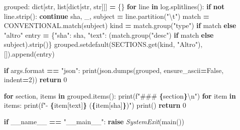 \documentclass[
  italian,
  10pt,
]{book}
\newenvironment{Shaded}{\begin{snugshade}}{\end{snugshade}}
\newcommand{\BuiltInTok}[1]{#1}
\newcommand{\CharTok}[1]{\textcolor[rgb]{0.31,0.60,0.02}{#1}}
\newcommand{\ControlFlowTok}[1]{\textcolor[rgb]{0.13,0.29,0.53}{\textbf{#1}}}
\newcommand{\DecValTok}[1]{\textcolor[rgb]{0.00,0.00,0.81}{#1}}
\newcommand{\KeywordTok}[1]{\textcolor[rgb]{0.13,0.29,0.53}{\textbf{#1}}}
\newcommand{\NormalTok}[1]{#1}
\newcommand{\OperatorTok}[1]{\textcolor[rgb]{0.81,0.36,0.00}{\textbf{#1}}}
\newcommand{\PreprocessorTok}[1]{\textcolor[rgb]{0.56,0.35,0.01}{\textit{#1}}}
\newcommand{\SpecialCharTok}[1]{\textcolor[rgb]{0.81,0.36,0.00}{\textbf{#1}}}
\newcommand{\SpecialStringTok}[1]{\textcolor[rgb]{0.31,0.60,0.02}{#1}}
\newcommand{\StringTok}[1]{\textcolor[rgb]{0.31,0.60,0.02}{#1}}
\newcommand{\VariableTok}[1]{\textcolor[rgb]{0.00,0.00,0.00}{#1}}
\begin{document}
\begin{Shaded}
\begin{Highlighting}[]
\NormalTok{    grouped: }\BuiltInTok{dict}\NormalTok{[}\BuiltInTok{str}\NormalTok{, }\BuiltInTok{list}\NormalTok{[}\BuiltInTok{dict}\NormalTok{[}\BuiltInTok{str}\NormalTok{, }\BuiltInTok{str}\NormalTok{]]] }\OperatorTok{=}\NormalTok{ \{\}}
    \ControlFlowTok{for}\NormalTok{ line }\KeywordTok{in}\NormalTok{ log.splitlines():}
        \ControlFlowTok{if} \KeywordTok{not}\NormalTok{ line.strip():}
            \ControlFlowTok{continue}
\NormalTok{        sha, \_, subject }\OperatorTok{=}\NormalTok{ line.partition(}\StringTok{"}\CharTok{\textbackslash{}t}\StringTok{"}\NormalTok{)}
\NormalTok{        match }\OperatorTok{=}\NormalTok{ CONVENTIONAL.match(subject)}
\NormalTok{        kind }\OperatorTok{=}\NormalTok{ match.group(}\StringTok{"type"}\NormalTok{) }\ControlFlowTok{if}\NormalTok{ match }\ControlFlowTok{else} \StringTok{"altro"}
\NormalTok{        entry }\OperatorTok{=}\NormalTok{ \{}\StringTok{"sha"}\NormalTok{: sha, }\StringTok{"text"}\NormalTok{: (match.group(}\StringTok{"desc"}\NormalTok{) }\ControlFlowTok{if}\NormalTok{ match }\ControlFlowTok{else}\NormalTok{ subject).strip()\}}
\NormalTok{        grouped.setdefault(SECTIONS.get(kind, }\StringTok{"Altro"}\NormalTok{), []).append(entry)}

    \ControlFlowTok{if}\NormalTok{ args.}\BuiltInTok{format} \OperatorTok{==} \StringTok{"json"}\NormalTok{:}
        \BuiltInTok{print}\NormalTok{(json.dumps(grouped, ensure\_ascii}\OperatorTok{=}\VariableTok{False}\NormalTok{, indent}\OperatorTok{=}\DecValTok{2}\NormalTok{))}
        \ControlFlowTok{return} \DecValTok{0}

    \ControlFlowTok{for}\NormalTok{ section, items }\KeywordTok{in}\NormalTok{ grouped.items():}
        \BuiltInTok{print}\NormalTok{(}\SpecialStringTok{f"\#\#\# }\SpecialCharTok{\{}\NormalTok{section}\SpecialCharTok{\}}\CharTok{\textbackslash{}n}\SpecialStringTok{"}\NormalTok{)}
        \ControlFlowTok{for}\NormalTok{ item }\KeywordTok{in}\NormalTok{ items:}
            \BuiltInTok{print}\NormalTok{(}\SpecialStringTok{f"{-} }\SpecialCharTok{\{}\NormalTok{item[}\StringTok{\textquotesingle{}text\textquotesingle{}}\NormalTok{]}\SpecialCharTok{\}}\SpecialStringTok{ (}\SpecialCharTok{\{}\NormalTok{item[}\StringTok{\textquotesingle{}sha\textquotesingle{}}\NormalTok{]}\SpecialCharTok{\}}\SpecialStringTok{)"}\NormalTok{)}
        \BuiltInTok{print}\NormalTok{()}
    \ControlFlowTok{return} \DecValTok{0}

\ControlFlowTok{if} \VariableTok{\_\_name\_\_} \OperatorTok{==} \StringTok{"\_\_main\_\_"}\NormalTok{:}
    \ControlFlowTok{raise} \PreprocessorTok{SystemExit}\NormalTok{(main())}
\end{Highlighting}
\end{Shaded}
\end{document}
